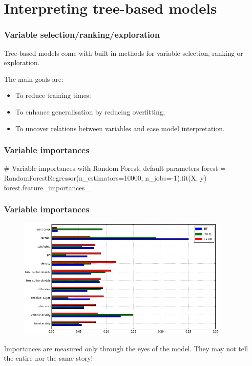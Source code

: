 \documentclass{beamer}
\begin{document}

\section{Interpreting tree-based models}

\begin{frame}[fragile]
  \frametitle{Variable selection/ranking/exploration}

  Tree-based models come with built-in methods for variable selection, ranking
  or exploration.

  \vspace{0.5cm}

  The main goals are:
  \begin{itemize}
  \item To reduce training times;
  \item To enhance generalisation by reducing overfitting;
  \item To uncover relations between variables and ease model interpretation.
  \end{itemize}

\end{frame}

\begin{frame}[fragile]
  \frametitle{Variable importances}

{\scriptsize
\begin{pythoncode}
# Variable importances with Random Forest, default parameters
forest = RandomForestRegressor(n_estimators=10000, n_jobs=-1).fit(X, y)
forest.feature_importances_
\end{pythoncode}
}

\end{frame}

\begin{frame}[fragile]
  \frametitle{Variable importances}

\begin{figure}
\includegraphics[width=0.95\textwidth]{./figures/importances.png}
\end{figure}

\begin{center}
Importances are measured only through the eyes of the model.
{\color{red}They may not tell the entire nor the same story!} \citep{louppe:2013}
\end{center}

\end{frame}
\end{document}
